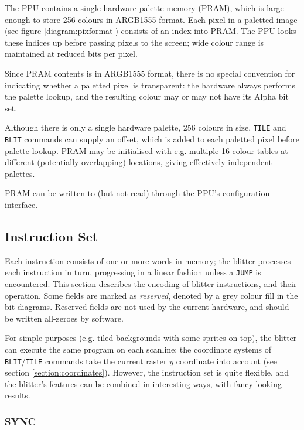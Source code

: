The PPU contains a single hardware palette memory (PRAM), which is large enough to store 256 colours in ARGB1555 format. Each pixel in a paletted image (see figure \ref{diagram:pixformat}) consists of an index into PRAM. The PPU looks these indices up before passing pixels to the screen; wide colour range is maintained at reduced bits per pixel.

Since PRAM contents is in ARGB1555 format, there is no special convention for indicating whether a paletted pixel is transparent: the hardware always performs the palette lookup, and the resulting colour may or may not have its Alpha bit set.

Although there is only a single hardware palette, 256 colours in size, {\tt TILE} and {\tt BLIT} commands can supply an offset, which is added to each paletted pixel before palette lookup. PRAM may be initialised with e.g. multiple 16-colour tables at different (potentially overlapping) locations, giving effectively independent palettes.

PRAM can be written to (but not read) through the PPU's configuration interface.

\subsection{Instruction Set}

\newcommand{\reservedfield}{\color{lightgray}\rule{\width}{\height}}

Each instruction consists of one or more words in memory; the blitter processes each instruction in turn, progressing in a linear fashion unless a {\tt JUMP} is encountered. This section describes the encoding of blitter instructions, and their operation. Some fields are marked as {\it reserved}, denoted by a grey colour fill in the bit diagrams. Reserved fields are not used by the current hardware, and should be written all-zeroes by software.

For simple purposes (e.g. tiled backgrounds with some sprites on top), the blitter can execute the same program on each scanline; the coordinate systems of {\tt BLIT}/{\tt TILE} commands take the current raster $y$ coordinate into account (see section \ref{section:coordinates}). However, the instruction set is quite flexible, and the blitter's features can be combined in interesting ways, with fancy-looking results.

\subsubsection*{SYNC}

